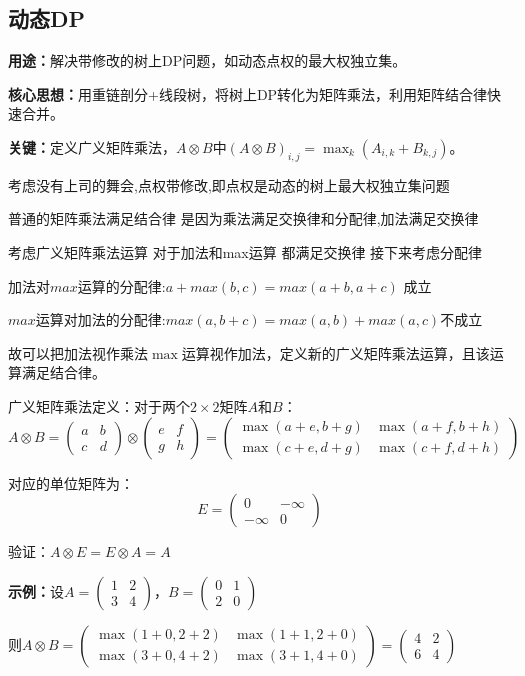 \documentclass[a4paper,fontset=none]{ctexart}
\begin{document}
\subsection{动态DP}
\textbf{用途：}解决带修改的树上DP问题，如动态点权的最大权独立集。

\textbf{核心思想：}用重链剖分+线段树，将树上DP转化为矩阵乘法，利用矩阵结合律快速合并。

\textbf{关键：}定义广义矩阵乘法，$A \otimes B$中$(A \otimes B)_{i,j} = \max_k(A_{i,k} + B_{k,j})$。

考虑没有上司的舞会,点权带修改,即点权是动态的树上最大权独立集问题

普通的矩阵乘法满足结合律 是因为乘法满足交换律和分配律,加法满足交换律

考虑广义矩阵乘法运算 对于加法和max运算 都满足交换律 接下来考虑分配律

加法对$max$运算的分配律:$a+max(b,c)=max(a+b,a+c)$ 成立

$max$运算对加法的分配律:$max(a,b+c)=max(a,b)+max(a,c)$不成立

故可以把加法视作乘法$\max$运算视作加法，定义新的广义矩阵乘法运算，且该运算满足结合律。

广义矩阵乘法定义：对于两个$2 \times 2$矩阵$A$和$B$：
$$A \otimes B = \begin{pmatrix}a&b\\c&d\end{pmatrix} \otimes \begin{pmatrix}e&f\\g&h\end{pmatrix} = \begin{pmatrix}\max(a+e,b+g) & \max(a+f,b+h) \\ \max(c+e,d+g) & \max(c+f,d+h)\end{pmatrix}$$

对应的单位矩阵为：
$$E = \begin{pmatrix}0 & -\infty \\ -\infty & 0\end{pmatrix}$$

验证：$A \otimes E = E \otimes A = A$

\textbf{示例：}设$A = \begin{pmatrix}1&2\\3&4\end{pmatrix}$，$B = \begin{pmatrix}0&1\\2&0\end{pmatrix}$

则$A \otimes B = \begin{pmatrix}\max(1+0,2+2) & \max(1+1,2+0) \\ \max(3+0,4+2) & \max(3+1,4+0)\end{pmatrix} = \begin{pmatrix}4&2\\6&4\end{pmatrix}$
\end{document}
